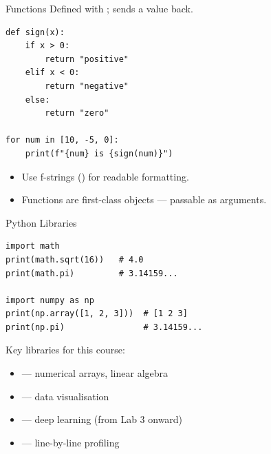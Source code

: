 \begin{frame}[fragile]{Functions}
    Defined with ;  sends a value back.

    \begin{lstlisting}
def sign(x):
    if x > 0:
        return "positive"
    elif x < 0:
        return "negative"
    else:
        return "zero"

for num in [10, -5, 0]:
    print(f"{num} is {sign(num)}")
    \end{lstlisting}

    \begin{itemize}
        \item Use f-strings () for readable formatting.
        \item Functions are first-class objects --- passable as arguments.
    \end{itemize}
\end{frame}

\begin{frame}[fragile]{Python Libraries}
    \begin{lstlisting}
import math
print(math.sqrt(16))   # 4.0
print(math.pi)         # 3.14159...

import numpy as np
print(np.array([1, 2, 3]))  # [1 2 3]
print(np.pi)                # 3.14159...
    \end{lstlisting}

    \vspace{0.5em}
    Key libraries for this course:
    \begin{itemize}
        \item {}         --- numerical arrays, linear algebra
        \item {}    --- data visualisation
        \item {}         --- deep learning (from Lab 3 onward)
        \item {} --- line-by-line profiling
    \end{itemize}
\end{frame}

